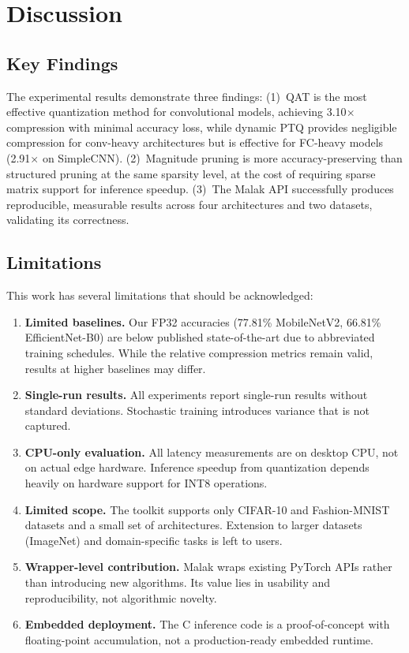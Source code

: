 \documentclass[10pt,twocolumn]{article}
\begin{document}
\section{Discussion}
\label{sec:discussion}

\subsection{Key Findings}

The experimental results demonstrate three findings:
(1)~QAT is the most effective quantization method for convolutional models, achieving 3.10$\times$ compression with minimal accuracy loss, while dynamic PTQ provides negligible compression for conv-heavy architectures but is effective for FC-heavy models (2.91$\times$ on SimpleCNN).
(2)~Magnitude pruning is more accuracy-preserving than structured pruning at the same sparsity level, at the cost of requiring sparse matrix support for inference speedup.
(3)~The Malak API successfully produces reproducible, measurable results across four architectures and two datasets, validating its correctness.

\subsection{Limitations}

This work has several limitations that should be acknowledged:

\begin{enumerate}
    \item \textbf{Limited baselines.} Our FP32 accuracies (77.81\% MobileNetV2, 66.81\% EfficientNet-B0) are below published state-of-the-art due to abbreviated training schedules. While the relative compression metrics remain valid, results at higher baselines may differ.
    \item \textbf{Single-run results.} All experiments report single-run results without standard deviations. Stochastic training introduces variance that is not captured.
    \item \textbf{CPU-only evaluation.} All latency measurements are on desktop CPU, not on actual edge hardware. Inference speedup from quantization depends heavily on hardware support for INT8 operations.
    \item \textbf{Limited scope.} The toolkit supports only CIFAR-10 and Fashion-MNIST datasets and a small set of architectures. Extension to larger datasets (ImageNet) and domain-specific tasks is left to users.
    \item \textbf{Wrapper-level contribution.} Malak wraps existing PyTorch APIs rather than introducing new algorithms. Its value lies in usability and reproducibility, not algorithmic novelty.
    \item \textbf{Embedded deployment.} The C inference code is a proof-of-concept with floating-point accumulation, not a production-ready embedded runtime.
\end{enumerate}
\end{document}
